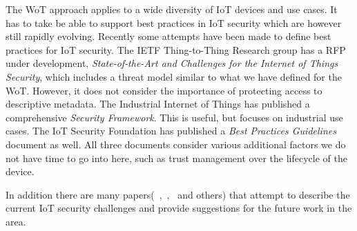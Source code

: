 The WoT approach applies to a wide diversity of IoT devices and use cases.
It has to take be able to support best practices in IoT security which
are however still rapidly evolving.
Recently some attempts have been made to define
best practices for IoT security.
The IETF Thing-to-Thing Research group has a RFP under development,
\emph{State-of-the-Art and Challenges for the Internet of Things 
Security}\cite{Garcia2017a}, which includes a threat model similar to 
what we have defined for the WoT.  However, it does not consider the 
importance of protecting access to descriptive metadata.
The Industrial Internet of Things has published a comprehensive
\emph{Security Framework}\cite{Iic2016sf}.
This is useful, but focuses on industrial use cases.
The IoT Security Foundation has published
a \textit{Best Practices Guidelines}\cite{Iotsf2017a}
document as well.
All three documents consider various additional factors we do
not have time to go into here, such as trust management over the 
lifecycle of the device.

In addition there are many papers(~\cite{Iot2020},~\cite{Xu2014},~\cite{Fernandes2017} and others)  that attempt to describe 
the current IoT security challenges and provide suggestions for the future work in the area.



